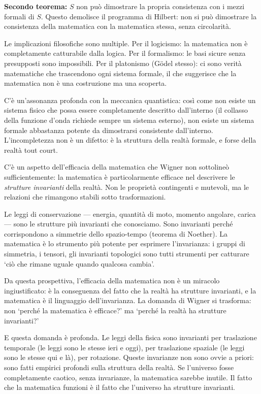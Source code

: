 \documentclass[12pt,a4paper,openany]{book}
\newcommand{\sezione}[1]{\vspace{1.2em}{\large\bfseries #1}\vspace{0.5em}\par}
\begin{document}
\textbf{Secondo teorema:} $S$ non può dimostrare la propria consistenza con i mezzi formali di $S$. Questo demolisce il programma di Hilbert: non si può dimostrare la consistenza della matematica con la matematica stessa, senza circolarità.

Le implicazioni filosofiche sono multiple. Per il logicismo: la matematica non è completamente catturabile dalla logica. Per il formalismo: le basi sicure senza presupposti sono impossibili. Per il platonismo (Gödel stesso): ci sono verità matematiche che trascendono ogni sistema formale, il che suggerisce che la matematica non è una costruzione ma una scoperta.

C'è un'assonanza profonda con la meccanica quantistica: così come non esiste un sistema fisico che possa essere completamente descritto dall'interno (il collasso della funzione d'onda richiede sempre un sistema esterno), non esiste un sistema formale abbastanza potente da dimostrarsi consistente dall'interno. L'incompletezza non è un difetto: è la struttura della realtà formale, e forse della realtà tout court.

\sezione{La matematica come linguaggio dell'invarianza}

C'è un aspetto dell'efficacia della matematica che Wigner non sottolineò sufficientemente: la matematica è particolarmente efficace nel descrivere le \textit{strutture invarianti} della realtà. Non le proprietà contingenti e mutevoli, ma le relazioni che rimangono stabili sotto trasformazioni.

Le leggi di conservazione --- energia, quantità di moto, momento angolare, carica --- sono le strutture più invarianti che conosciamo. Sono invarianti perché corrispondono a simmetrie dello spazio-tempo (teorema di Noether). La matematica è lo strumento più potente per esprimere l'invarianza: i gruppi di simmetria, i tensori, gli invarianti topologici sono tutti strumenti per catturare `ciò che rimane uguale quando qualcosa cambia'.

Da questa prospettiva, l'efficacia della matematica non è un miracolo ingiustificato: è la conseguenza del fatto che la realtà ha strutture invarianti, e la matematica è il linguaggio dell'invarianza. La domanda di Wigner si trasforma: non `perché la matematica è efficace?' ma `perché la realtà ha strutture invarianti?'

E questa domanda è profonda. Le leggi della fisica sono invarianti per traslazione temporale (le leggi sono le stesse ieri e oggi), per traslazione spaziale (le leggi sono le stesse qui e là), per rotazione. Queste invarianze non sono ovvie a priori: sono fatti empirici profondi sulla struttura della realtà. Se l'universo fosse completamente caotico, senza invarianze, la matematica sarebbe inutile. Il fatto che la matematica funzioni è il fatto che l'universo ha strutture invarianti.
\end{document}

